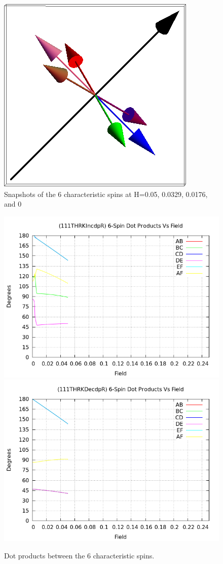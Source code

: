 \documentclass{article}
\begin{document}
\begin{figure}[ht]
\includegraphics[scale=0.33]{111_3000/501S005to000R.png}
\caption{Snapshots of the 6 characteristic spins at H=0.05, 0.0329, 0.0176, and 0}
\end{figure}
\clearpage

\begin{figure}[ht]
\centering
\includegraphics[scale=0.55]{HVariedData/Pictures/111THRKIncdpR.png}
\includegraphics[scale=0.55]{HVariedData/Pictures/111THRKDecdpR.png}
\caption{Dot products between the 6 characteristic spins. }
\end{figure}
\clearpage
\end{document}
